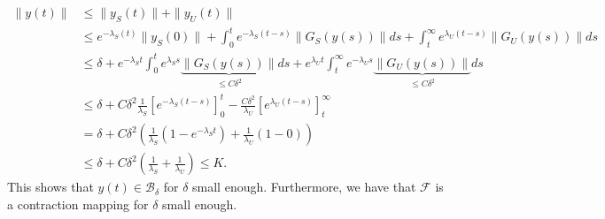 \begin{enumerate}
\begin{subequations}
\begin{align}
	\|y(t)\| &\leq \| y_{S}(t)\| + \|y_{U}(t) \| \\
		 &\leq e^{-\lambda _{S}(t)}\| y_{S}(0)\| + \int_{0}^{t} e^{-\lambda _{S}(t-s)}{\| G_{S}(y(s))\|} ds + \int_{t}^{\infty } e^{\lambda _{U}(t-s)}{\|G_{U}(y(s))\|}ds \\
		 &\leq \delta + e^{-\lambda _{S}t}\int_{0}^{t} e^{\lambda _{S}s}\underbrace{\| G_{S}(y(s))\|}_{\leq C\delta^{2}} ds + e^{\lambda _{U}t}\int_{t}^{\infty } e^{-\lambda _{U}s}\underbrace{\|G_{U}(y(s))\|}_{\leq C\delta ^{2}}ds \\
		 &\leq \delta + C\delta^{2} \frac{1}{\lambda_{S}} \left[ e^{-\lambda _{S}(t-s)}\right]_{0}^{t} - \frac{C \delta^2}{\lambda _{U}} \left[ e^{\lambda _{U}(t-s)}\right]_{t}^{\infty } \\
		 &= \delta + C \delta^{2} \left( \frac{1}{\lambda_{S}}\left(1 - e^{-\lambda _{S}t}\right) + \frac{1}{\lambda _{U}}\left(1-0\right) \right) \\
		 &\leq \delta + C \delta^{2} \left( \frac{1}{\lambda _S} + \frac{1}{\lambda _U}\right) \leq K.
\end{align}
\end{subequations}
This shows that $y(t) \in \mathcal{B}_{\delta}$ for $\delta$ small enough. Furthermore, we have that $\mathcal{F}$ is a contraction mapping for $\delta$ small enough.
\end{enumerate}

